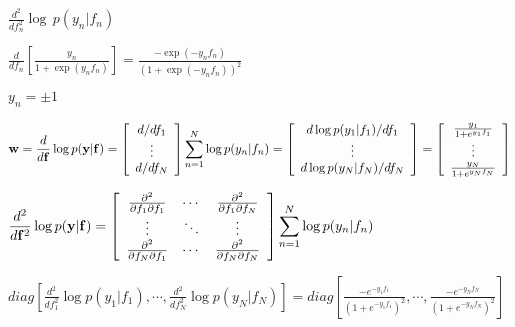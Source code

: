 \documentclass{article}
\def\lthtmlcheckvsize{\ifdim\ht\sizebox<\vsize 
  \ifdim\wd\sizebox<\hsize\expandafter\hfill\fi \expandafter\vfill
  \else\expandafter\vss\fi}%
\begin{document}
{\newpage\clearpage
{}%
$\displaystyle \frac{d^2}{df_n^2}\log\,p(y_n|f_n)$%
\lthtmlindisplaymathZ
\lthtmlcheckvsize\clearpage}

{\newpage\clearpage
{}%
$\displaystyle \frac{d}{df_n}\left[\frac{y_n}{1+\exp(y_n f_n)}\right]
=\frac{-\exp(-y_n f_n)}{(1+\exp(-y_n f_n))^2}$%
\lthtmlindisplaymathZ
\lthtmlcheckvsize\clearpage}

{\newpage\clearpage
{}%
$ y_n=\pm 1$%
\lthtmlindisplaymathZ
\lthtmlcheckvsize\clearpage}

{\newpage\clearpage
{}%
$\displaystyle {\bf w}=\frac{d}{d{\bf f}} \log p({\bf y}|{\bf f})
=\left[\begin{array}{c}d/df_1\\\vdots\\d/df_N\end{array}\right]
\sum_{n=1}^N\log p(y_n|f_n)
=\left[\begin{array}{c}
d\log p(y_1|f_1)/df_1\\\vdots\\d\log p(y_N|f_N)/df_N
\end{array}\right]
=\left[\begin{array}{c}
\frac{y_1}{1+e^{y_1f_1}}\\\vdots\\\frac{y_N}{1+e^{y_Nf_N}}
\end{array}\right]$%
\lthtmlindisplaymathZ
\lthtmlcheckvsize\clearpage}

{\newpage\clearpage
{}%
$\displaystyle \frac{d^2}{d{\bf f}^2}  \log p({\bf y}|{\bf f})
=\left[\begin{array}{ccc}
\frac{\partial^2}{\partial f_1\partial f_1}&\cdots
&\frac{\partial^2}{\partial f_1\partial f_N}\\
\vdots&\ddots&\vdots\\
\frac{\partial^2}{\partial f_N\partial f_1}&\cdots
&\frac{\partial^2}{\partial f_N\partial f_N}\\
\end{array}\right]\sum_{n=1}^N\log p(y_n|f_n)$%
\lthtmlindisplaymathZ
\lthtmlcheckvsize\clearpage}

{\newpage\clearpage
{}%
$\displaystyle diag \left[
\frac{d^2}{df_1^2}\log p(y_1|f_1),\cdots,\frac{d^2}{df_N^2}\log p(y_N|f_N)
\right]
=diag \left[
\frac{-e^{-y_1f_1}}{(1+e^{-y_1f_1})^2},\cdots,\frac{-e^{-y_Nf_N}}{(1+e^{-y_Nf_N})^2}
\right]$%
\lthtmlindisplaymathZ
\lthtmlcheckvsize\clearpage}
\end{document}
